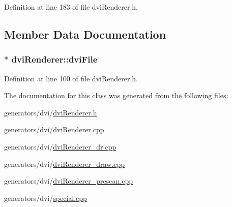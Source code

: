 Definition at line 183 of file dvi\+Renderer.\+h.



\subsection{Member Data Documentation}
\hypertarget{classdviRenderer_a67ded13a1a8da343aa0ee921ed96d4c2}{
\subsubsection[{dvi\+File}]{$\ast$ dvi\+Renderer\+::dvi\+File}}\label{classdviRenderer_a67ded13a1a8da343aa0ee921ed96d4c2}


Definition at line 100 of file dvi\+Renderer.\+h.



The documentation for this class was generated from the following files\+:\begin{DoxyCompactItemize}
\item 
generators/dvi/\hyperlink{dviRenderer_8h}{dvi\+Renderer.\+h}\item 
generators/dvi/\hyperlink{dviRenderer_8cpp}{dvi\+Renderer.\+cpp}\item 
generators/dvi/\hyperlink{dviRenderer__dr_8cpp}{dvi\+Renderer\+\_\+dr.\+cpp}\item 
generators/dvi/\hyperlink{dviRenderer__draw_8cpp}{dvi\+Renderer\+\_\+draw.\+cpp}\item 
generators/dvi/\hyperlink{dviRenderer__prescan_8cpp}{dvi\+Renderer\+\_\+prescan.\+cpp}\item 
generators/dvi/\hyperlink{special_8cpp}{special.\+cpp}\end{DoxyCompactItemize}
